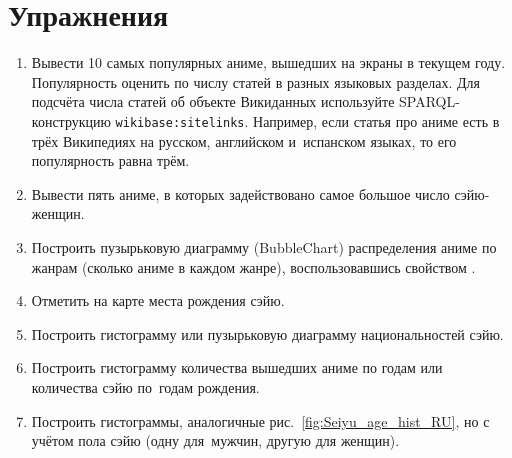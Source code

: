 \section{Упражнения}

\begin{enumerate}
    \item Вывести 10 самых популярных аниме, вышедших на экраны в текущем году. 
        Популярность оценить по числу статей в разных языковых разделах. 
        Для подсчёта числа статей об объекте Викиданных используйте SPARQL-конструкцию \lstinline|wikibase:sitelinks|. 
        Например, если статья про аниме есть в трёх Википедиях на русском, английском и~испанском языках, то его популярность равна трём. 
    \item Вывести пять аниме, в которых задействовано самое большое число сэйю-женщин.
    \item Построить пузырьковую диаграмму (BubbleChart) распределения аниме по жанрам (сколько аниме в каждом жанре), воспользовавшись свойством .
    \item Отметить на карте места рождения сэйю.
    \item Построить гистограмму или пузырьковую диаграмму национальностей сэйю.
    \item Построить гистограмму количества вышедших аниме по годам или количества сэйю по~годам рождения.
    \item Построить гистограммы, аналогичные рис.~\ref{fig:Seiyu_age_hist_RU}, но с учётом пола сэйю (одну для~мужчин, другую для женщин).
\end{enumerate}
